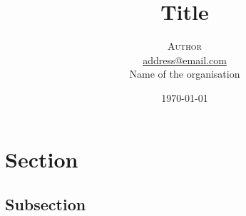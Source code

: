 \documentclass[twoside,twocolumn]{article}
\title{Title} %
\author{\textsc{Author}\\
\normalsize \href{mailto:address@email.com}{address@email.com} %
\vspace{0.4cm}\\
\normalsize Name of the organisation
}
\date{\today} %
\begin{document}
\maketitle


\section{Section}

\subsection{Subsection}



\printbibliography
\end{document}
